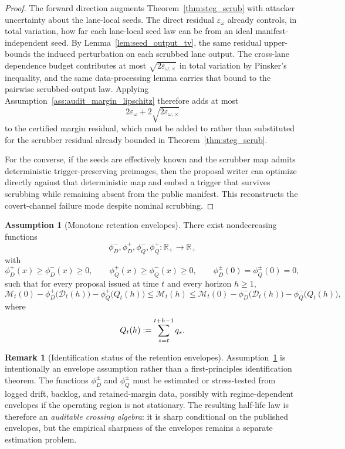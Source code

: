 \documentclass[11pt]{article}
\theoremstyle{definition}
\newtheorem{assumption}[theorem]{Assumption}
\newtheorem{remark}[theorem]{Remark}
\newcommand{\R}{\mathbb{R}}
\newcommand{\1}{\mathbf{1}}
\newcommand{\Defeq}{\vcentcolon=}
\begin{document}
\begin{proof}
The forward direction augments Theorem~\ref{thm:steg_scrub} with attacker uncertainty about the lane-local seeds. The direct residual $\varepsilon_{\omega}$ already controls, in total variation, how far each lane-local seed law can be from an ideal manifest-independent seed. By Lemma~\ref{lem:seed_output_tv}, the same residual upper-bounds the induced perturbation on each scrubbed lane output. The cross-lane dependence budget contributes at most $\sqrt{2\varepsilon_{\omega,\times}}$ in total variation by Pinsker's inequality, and the same data-processing lemma carries that bound to the pairwise scrubbed-output law. Applying Assumption~\ref{ass:audit_margin_lipschitz} therefore adds at most
\[
2\varepsilon_{\omega}+2\sqrt{2\varepsilon_{\omega,\times}}
\]
to the certified margin residual, which must be added to rather than substituted for the scrubber residual already bounded in Theorem~\ref{thm:steg_scrub}.

For the converse, if the seeds are effectively known and the scrubber map admits deterministic trigger-preserving preimages, then the proposal writer can optimize directly against that deterministic map and embed a trigger that survives scrubbing while remaining absent from the public manifest. This reconstructs the covert-channel failure mode despite nominal scrubbing.
\end{proof}


\begin{assumption}[Monotone retention envelopes]\label{ass:retention_bounds}
There exist nondecreasing functions
\[
\phi_D^-,\phi_D^+,\phi_Q^-,\phi_Q^+:
\R_+\to\R_+
\]
with
\[
\phi_D^+(x)\ge \phi_D^-(x)\ge 0,
\qquad
\phi_Q^+(x)\ge \phi_Q^-(x)\ge 0,
\qquad
\phi_D^{\pm}(0)=\phi_Q^{\pm}(0)=0,
\]
such that for every proposal issued at time $t$ and every horizon $h\ge1$,
\[
\mathcal M_t(0)-\phi_D^+\!\bigl(\mathcal D_t(h)\bigr)-\phi_Q^+\!\bigl(Q_t(h)\bigr)
\le
\mathcal M_t(h)
\le
\mathcal M_t(0)-\phi_D^-\!\bigl(\mathcal D_t(h)\bigr)-\phi_Q^-\!\bigl(Q_t(h)\bigr),
\]
where
\[
Q_t(h)\Defeq \sum_{s=t}^{t+h-1}q_s.
\]
\end{assumption}

\begin{remark}[Identification status of the retention envelopes]\label{rem:retention_identification}
Assumption~\ref{ass:retention_bounds} is intentionally an envelope assumption rather than a first-principles identification theorem. The functions $\phi_D^{\pm}$ and $\phi_Q^{\pm}$ must be estimated or stress-tested from logged drift, backlog, and retained-margin data, possibly with regime-dependent envelopes if the operating region is not stationary. The resulting half-life law is therefore an \emph{auditable crossing algebra}: it is sharp conditional on the published envelopes, but the empirical sharpness of the envelopes remains a separate estimation problem.
\end{remark}
\end{document}
